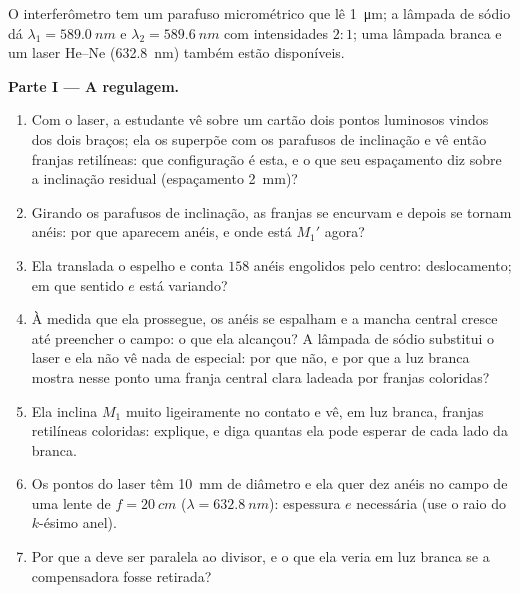 \begin{problem}
\label{pb:b2:michelson:1}

O interferômetro tem um parafuso micrométrico que lê \qty{1}{\micro m}; a
lâmpada de sódio dá $\lambda_1 = \qty{589.0}{nm}$ e $\lambda_2 = \qty{589.6}{nm}$ com
intensidades $2 : 1$; uma lâmpada branca e um laser He--Ne (\qty{632.8}{nm}) também
estão disponíveis.

\medskip
\noindent\textbf{Parte I --- A regulagem.}
\begin{enumerate}
  \item Com o laser, a estudante vê sobre um cartão dois pontos luminosos
        vindos dos dois braços; ela os superpõe com os parafusos de inclinação e vê então
        franjas retilíneas: que configuração é esta, e o que
        seu espaçamento diz sobre a inclinação residual (espaçamento \qty{2}{mm})?
  \item Girando os parafusos de inclinação, as franjas se encurvam e depois se tornam
        anéis: por que aparecem anéis, e onde está $M_1'$ agora?
  \item Ela translada o espelho e conta $158$ anéis engolidos pelo
        centro: deslocamento; em que sentido $e$ está variando?
  \item À medida que ela prossegue, os anéis se espalham e a mancha central cresce
        até preencher o campo: o que ela alcançou? A lâmpada de sódio
        substitui o laser e ela não vê nada de especial: por que não, e
        por que a luz branca mostra nesse ponto uma franja central clara
        ladeada por franjas coloridas?
  \item Ela inclina $M_1$ muito ligeiramente no contato e vê, em luz
        branca, franjas retilíneas coloridas: explique, e diga quantas
        ela pode esperar de cada lado da branca.
  \item Os pontos do laser têm \qty{10}{mm} de diâmetro e ela quer dez anéis
        no campo de uma lente de $f = \qty{20}{cm}$ ($\lambda = \qty{632.8}{nm}$):
        espessura $e$ necessária (use o raio do $k$-ésimo anel).
  \item Por que a  deve ser paralela ao divisor,
        e o que ela veria em luz branca se a compensadora fosse retirada?
\end{enumerate}


\end{problem}
